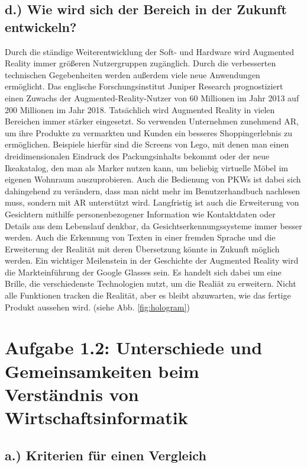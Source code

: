 \documentclass[12pt,utf8]{scrartcl}
\begin{document}
\begin{flushleft}
\subsection*{\label{sub4:thema}d.) Wie wird sich der Bereich in der Zukunft entwickeln?}

Durch die ständige Weiterentwicklung der Soft- und Hardware wird Augmented Reality immer größeren Nutzergruppen zugänglich. Durch die verbesserten technischen Gegebenheiten werden außerdem viele neue Anwendungen ermöglicht. Das englische Forschungsinstitut Juniper Research prognostiziert einen Zuwachs der Augmented-Reality-Nutzer von 60 Millionen im Jahr 2013 auf 200 Millionen im Jahr 2018. Tatsächlich wird Augmented Reality in vielen Bereichen immer stärker eingesetzt. So verwenden Unternehmen zunehmend AR, um ihre Produkte zu vermarkten und Kunden ein besseres Shoppingerlebnis zu ermöglichen. Beispiele hierfür sind die Screens von Lego, mit denen man einen dreidimensionalen Eindruck des Packungsinhalts bekommt oder der neue Ikeakatalog, den man als Marker nutzen kann, um beliebig virtuelle Möbel im eigenen Wohnraum auszuprobieren. Auch die Bedienung von PKWs ist dabei sich dahingehend zu verändern, dass man nicht mehr im Benutzerhandbuch nachlesen muss, sondern mit AR unterstützt wird. Langfristig ist auch die Erweiterung von Gesichtern mithilfe personenbezogener Information wie Kontaktdaten oder Details aus dem Lebenslauf denkbar, da Gesichtserkennungssysteme immer besser werden. Auch die Erkennung von Texten in einer fremden Sprache und die Erweiterung der Realität mit deren Übersetzung könnte in Zukunft möglich werden. Ein wichtiger Meilenstein in der Geschichte der Augmented Reality wird die Markteinführung der Google Glasses sein. Es handelt sich dabei um eine Brille, die verschiedenste Technologien nutzt, um die Realiät zu erweitern. Nicht alle Funktionen tracken die Realität, aber es bleibt abzuwarten, wie das fertige Produkt aussehen wird. (siehe Abb. \ref{fig:hologram})

\section*{\label{sec:einfuehrung}Aufgabe 1.2: Unterschiede und Gemeinsamkeiten beim Verständnis von Wirtschaftsinformatik}
\subsection*{\label{sub:einfuehrung}a.) Kriterien für einen Vergleich}


\end{flushleft}
\end{document}
